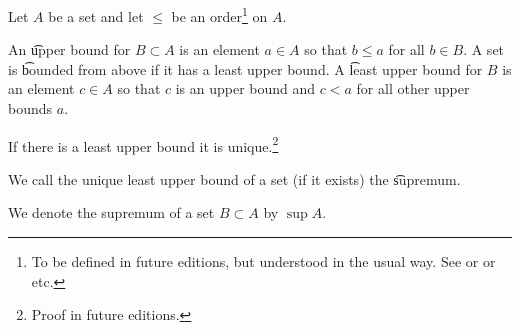 


Let $A$ be a set and let $\leq$ be an order\footnote{To be defined in future editions, but understood in the usual way. See  or  or  etc.} on $A$.

An \t{upper bound} for $B \subset A$ is an element $a \in A$ so that $b \leq a$ for all $b \in B$.
A set is \t{bounded from above} if it has a least upper bound.
A \t{least upper bound} for $B$ is an element $c \in A$ so that $c$ is an upper bound and $c < a$ for all other upper bounds $a$.

\begin{proposition}
  If there is a least upper bound it is unique.\footnote{Proof in future editions.}
\end{proposition}

We call the unique least upper bound of a set (if it exists) the \t{supremum}.


We denote the supremum of a set $B \subset A$ by $\sup A$.


\blankpage
